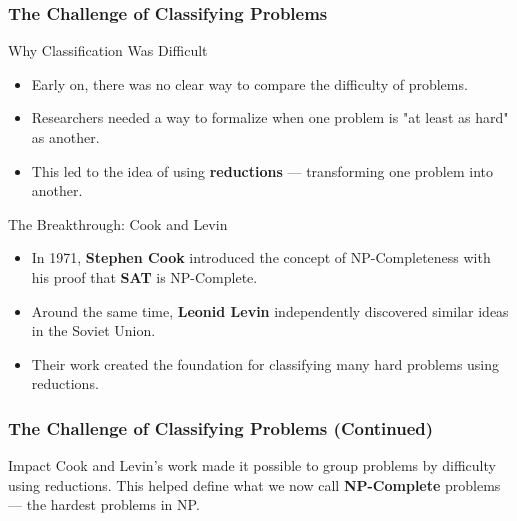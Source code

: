 \documentclass[10pt,aspectratio=43]{beamer}
\begin{document}
\begin{frame}
    \frametitle{The Challenge of Classifying Problems}

    \begin{block}{Why Classification Was Difficult}
        \begin{itemize}
            \item Early on, there was no clear way to compare the difficulty of problems.
            \item Researchers needed a way to formalize when one problem is "at least as hard" as another.
            \item This led to the idea of using \textbf{reductions} — transforming one problem into another.
        \end{itemize}
    \end{block}

    \vspace{0.5em}

    \begin{block}{The Breakthrough: Cook and Levin}
        \begin{itemize}
            \item In 1971, \textbf{Stephen Cook} introduced the concept of NP-Completeness with his proof that \textbf{SAT} is NP-Complete.
            \item Around the same time, \textbf{Leonid Levin} independently discovered similar ideas in the Soviet Union.
            \item Their work created the foundation for classifying many hard problems using reductions.
        \end{itemize}
    \end{block}

    \vspace{0.5em}
\end{frame}
\begin{frame}
    \frametitle{The Challenge of Classifying Problems (Continued)}
    \begin{block}{Impact}
        Cook and Levin's work made it possible to group problems by difficulty using reductions.
        This helped define what we now call \textbf{NP-Complete} problems — the hardest problems in NP.
    \end{block}
\end{frame}
\end{document}
